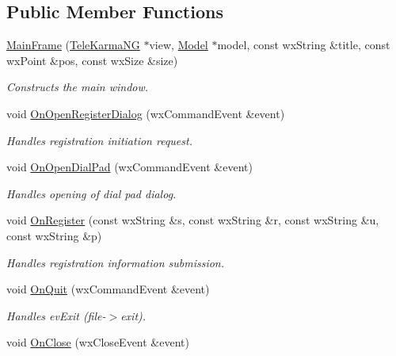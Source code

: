 \subsection*{Public Member Functions}
\begin{CompactItemize}
\item 
\hyperlink{classMainFrame_09f15beb9d0af78bd614358ad05b09f7}{MainFrame} (\hyperlink{classTeleKarmaNG}{TeleKarmaNG} $\ast$view, \hyperlink{classModel}{Model} $\ast$model, const wxString \&title, const wxPoint \&pos, const wxSize \&size)
\begin{CompactList}\small\item\em Constructs the main window. \item\end{CompactList}\item 
void \hyperlink{classMainFrame_5981c8c376f0b84971cd2f0574046ec7}{OnOpenRegisterDialog} (wxCommandEvent \&event)
\begin{CompactList}\small\item\em Handles registration initiation request. \item\end{CompactList}\item 
void \hyperlink{classMainFrame_330d1881b7c14a2d29235f3f437b0456}{OnOpenDialPad} (wxCommandEvent \&event)
\begin{CompactList}\small\item\em Handles opening of dial pad dialog. \item\end{CompactList}\item 
void \hyperlink{classMainFrame_b287a8d769abe22d71300beb96b14f03}{OnRegister} (const wxString \&s, const wxString \&r, const wxString \&u, const wxString \&p)
\begin{CompactList}\small\item\em Handles registration information submission. \item\end{CompactList}\item 
void \hyperlink{classMainFrame_6c21335bf2a3393f54b46889c8a559e5}{OnQuit} (wxCommandEvent \&event)
\begin{CompactList}\small\item\em Handles evExit (file-$>$exit). \item\end{CompactList}\item 
void \hyperlink{classMainFrame_9f6f7f89d8b9aded1334cfa6eaca22bc}{OnClose} (wxCloseEvent \&event)

\end{CompactItemize}

